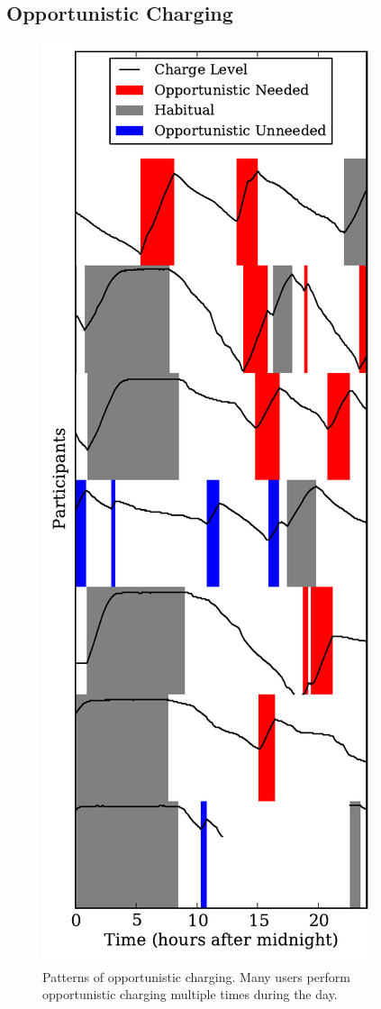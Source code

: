 \subsection{Opportunistic Charging}
\label{subsec-opportunistic}

\begin{figure}[t]
\includegraphics[width=\columnwidth]{./figures/power/opportunistic_charging/count_and_by_time/graph.pdf}
\caption{Patterns of opportunistic charging. \textnormal{Many users perform
opportunistic charging multiple times during the day.}}
\label{fig-opportunistic-patterns}
\end{figure}

